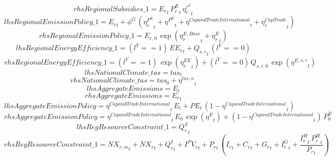 \begin{dmath*}
rhsRegionalSubsidies\_1 = {{E_r}}_{t}\, {{P^E_r}}_{t}\, {{\eta^{\tau^{S}}_r}}_{t}
\end{dmath*}
\begin{dmath*}
lhsRegionalEmissionPolicy\_1 = {{E_r}}_{t}+{{\phi^{G}}}\, \left({{\eta^{P^E}_r}}_{t}+{{\eta^{P^E}}}_{t}+{{\eta^{Cap and Trade International}}}_{t}+{{\eta^{CapTrade}_r}}_{t}\right)
\end{dmath*}
\begin{dmath*}
rhsRegionalEmissionPolicy\_1 = {{E_{r,0}}}\, \exp\left({{\eta^{E,Base}_r}}_{t}+{{\eta^{E}_r}}_{t}\right)
\end{dmath*}
\begin{dmath*}
lhsRegionalEnergyEfficiency\_1 = \left({{l^{Y}}}==1\right)\, {{EE_r}}_{t}+{{Q_{s,r}}}_{t}\, \left({{l^{Y}}}==0\right)
\end{dmath*}
\begin{dmath*}
rhsRegionalEnergyEfficiency\_1 = \left({{l^{Y}}}==1\right)\, \exp\left({{\eta^{EE}_r}}_{t}\right)+\left({{l^{Y}}}==0\right)\, {{Q_{s,r,0}}}\, \exp\left({{\eta^{E,s,r}}}_{t}\right)
\end{dmath*}
\begin{dmath*}
lhsNationalClimate\_tas = {{tas}}_{t}
\end{dmath*}
\begin{dmath*}
rhsNationalClimate\_tas = {{tas_{0}}}+{{\eta^{tas,n}}}_{t}
\end{dmath*}
\begin{dmath*}
lhsAggregateEmissions = {E}_{t}
\end{dmath*}
\begin{dmath*}
rhsAggregateEmissions = {{E_r}}_{t}
\end{dmath*}
\begin{dmath*}
lhsAggregateEmissionPolicy = {{\eta^{Cap and Trade International}}}_{t}\, {E}_{t}+{PE}_{t}\, \left(1-{{\eta^{Cap and Trade International}}}_{t}\right)
\end{dmath*}
\begin{dmath*}
rhsAggregateEmissionPolicy = {{\eta^{Cap and Trade International}}}_{t}\, {{E_0}}\, \exp\left({{\eta^{E}}}_{t}\right)+\left(1-{{\eta^{Cap and Trade International}}}_{t}\right)\, {{P^E_0}}
\end{dmath*}
\begin{dmath*}
lhsRegResourceConstraint\_1 = {{Q^S_r}}_{t}
\end{dmath*}
\begin{dmath*}
rhsRegResourceConstraint\_1 = {{NX_{r,m}}}_{t}+{{NX_r}}_{t}+{{Q^I_r}}_{t}+{{I^PV_r}}_{t}+{{P_{r}}}_{t}\, \left({{I_{r}}}_{t}+{{C_r}}_{t}+{{G_{r}}}_{t}+{{I^G_{r}}}_{t}+\frac{{{I^H_r}}_{t}\, {{P^H_r}}_{t}}{{{P_{r}}}_{t}}\right)
\end{dmath*}
